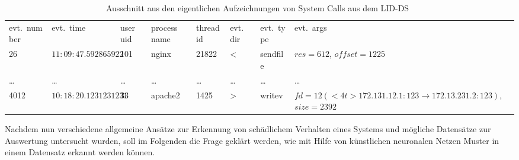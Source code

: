                \begin{table}[ht]
                    \tiny
                    \centering
                    \begin{tabular}{p{1.1cm}p{1.1cm}p{0.4cm}p{0.6cm}p{0.6cm}p{0.8cm}p{0.6cm}p{1cm}}
                        \rowcolor{Gray!36}
                        \hline
                        \multicolumn{8}{c}{System Call}\\
                        \hline
                        evt.\ number & evt.\ time & user uid & process name & thread id & evt.\ dir & evt.\ type & evt.\ args \\
                        \hline
                        \hline
                        \rowcolor{Gray!16}
                        26 & $11:09:47.592865922$ & 101 & nginx & 21822 & < & sendfile & $res=612$, $offset=1225$ \\
                        \hline
                        \dots & \dots & \dots & \dots & \dots & \dots & \dots & \dots \\
                        \hline
                        \rowcolor{Gray!16}
                        4012 & $10:18:20.1231231231$ & 33 & apache2 & 1425 & > & writev & $fd=12(<4t>172.131.12.1:123\rightarrow172.13.231.2:123)$, $size=2392$ \\
                        \hline
                    \end{tabular}
                    \caption{Ausschnitt aus den eigentlichen Aufzeichnungen von System Calls aus dem LID-DS~\cite{LIDDS}}
                    \label{tab:syscallfile}
                \end{table}

                Nachdem nun verschiedene allgemeine Ansätze zur Erkennung von schädlichem Verhalten eines Systems und mögliche Datensätze zur Auswertung untersucht wurden,
                soll im Folgenden die Frage geklärt werden, wie mit Hilfe von künstlichen neuronalen Netzen Muster in einem Datensatz erkannt werden können.

